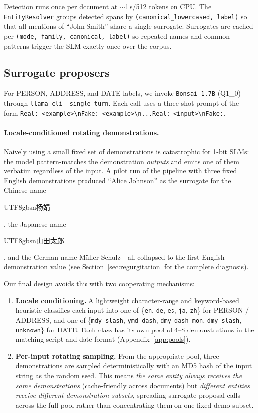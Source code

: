 \documentclass[11pt]{article}
\newcommand{\code}[1]{\texttt{#1}}
\newcommand{\bonsai}{\code{Bonsai-1.7B}}
\newcommand{\cjk}[1]{\begin{CJK*}{UTF8}{gbsn}#1\end{CJK*}}
\begin{document}
Detection runs once per document at $\sim$1\,s/512 tokens on CPU. The
\code{EntityResolver} groups detected spans by
\code{(canonical\_lowercased, label)} so that all mentions of ``John
Smith'' share a single surrogate. Surrogates are cached per
\code{(mode, family, canonical, label)} so repeated names and common
patterns trigger the SLM exactly once over the corpus.

\subsection{Surrogate proposers}
\label{sec:proposers}

For PERSON, ADDRESS, and DATE labels, we invoke \bonsai{} (Q1\_0)
through \code{llama-cli --single-turn}. Each call uses a three-shot
prompt of the form \code{Real: <example>\textbackslash{}nFake:
<example>\textbackslash{}n...Real: <input>\textbackslash{}nFake:}.

\paragraph{Locale-conditioned rotating demonstrations.}
Naively using a small fixed set of demonstrations is catastrophic for
1-bit SLMs: the model pattern-matches the demonstration \emph{outputs}
and emits one of them verbatim regardless of the input. A pilot run of
the pipeline with three fixed English demonstrations produced ``Alice
Johnson'' as the surrogate for the Chinese name \cjk{杨娟}, the
Japanese name \cjk{山田太郎}, and the German name M\"uller-Schulz---all
collapsed to the first English demonstration value (see
Section~\ref{sec:regurgitation} for the complete diagnosis).

Our final design avoids this with two cooperating mechanisms:
\begin{enumerate}[leftmargin=*, itemsep=2pt, topsep=2pt]
  \item \textbf{Locale conditioning.} A lightweight character-range and
        keyword-based heuristic classifies each input into one of
        \{\code{en}, \code{de}, \code{es}, \code{ja}, \code{zh}\} for
        PERSON / ADDRESS, and one of \{\code{mdy\_slash},
        \code{ymd\_dash}, \code{dmy\_dash\_mon}, \code{dmy\_slash},
        \code{unknown}\} for DATE. Each class has its own pool of 4--8
        demonstrations in the matching script and date format
        (Appendix~\ref{app:pools}).
  \item \textbf{Per-input rotating sampling.} From the appropriate
        pool, three demonstrations are sampled deterministically with
        an MD5 hash of the input string as the random seed. This means
        \emph{the same entity always receives the same demonstrations}
        (cache-friendly across documents) but \emph{different entities
        receive different demonstration subsets}, spreading
        surrogate-proposal calls across the full pool rather than
        concentrating them on one fixed demo subset.
\end{enumerate}
\end{document}
